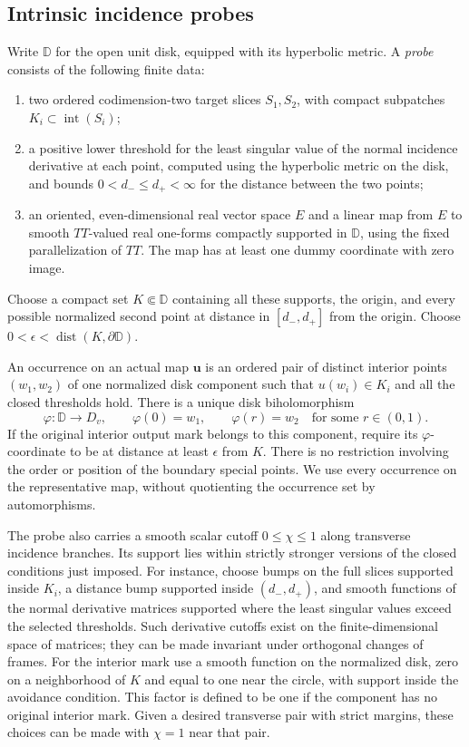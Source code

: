 \subsection{Intrinsic incidence probes}

Write $\mathbb D$ for the open unit disk, equipped with its hyperbolic
metric.  A \emph{probe} consists of the following finite data:
\begin{enumerate}[label=\textup{(\alph*)}]
\item two ordered codimension-two target slices $S_1,S_2$, with compact
subpatches $K_i\subset\operatorname{int}(S_i)$;
\item a positive lower threshold for the least singular value of the
normal incidence derivative at each point, computed using the hyperbolic
metric on the disk, and bounds
$0<d_-\le d_+<\infty$ for the distance between the two points;
\item an oriented, even-dimensional real vector space $E$ and a linear
map from $E$ to smooth $TT$-valued real one-forms compactly supported in
$\mathbb D$, using the fixed parallelization of $TT$.  The map has at
least one dummy coordinate with zero image.
\end{enumerate}
Choose a compact set $K\Subset\mathbb D$ containing all these supports,
the origin, and every possible normalized second point at distance in
$[d_-,d_+]$ from the origin.  Choose
$0<\epsilon<\operatorname{dist}(K,\partial\mathbb D)$.

An occurrence on an actual map $\mathbf u$ is an ordered pair of distinct
interior points $(w_1,w_2)$ of one normalized disk component such that
$u(w_i)\in K_i$ and all the closed thresholds hold.  There is a unique
disk biholomorphism
\[
 \varphi:\mathbb D\longrightarrow D_v,
 \qquad \varphi(0)=w_1,\qquad
 \varphi(r)=w_2\quad\text{for some }r\in(0,1).
\]
If the original interior output mark belongs to this component, require
its $\varphi$-coordinate to be at distance at least $\epsilon$ from $K$.
There is no restriction involving the order or position of the boundary
special points.  We use every occurrence on the representative map,
without quotienting the occurrence set by automorphisms.

The probe also carries a smooth scalar cutoff $0\le\chi\le1$ along
transverse incidence branches.  Its support lies within strictly stronger
versions of the closed conditions just imposed.  For instance, choose
bumps on the full slices supported inside $K_i$, a distance bump supported
inside $(d_-,d_+)$, and smooth functions of the normal derivative matrices
supported where the least singular values exceed the selected
thresholds.  Such derivative cutoffs exist on the finite-dimensional
space of matrices; they can be made invariant under orthogonal changes
of frames.  For the interior mark use a smooth function on the normalized
disk, zero on a neighborhood of $K$ and equal to one near the circle,
with support inside the avoidance condition.  This factor is defined to
be one if the component has no original interior mark.  Given a desired
transverse pair with strict margins, these choices can be made with
$\chi=1$ near that pair.

